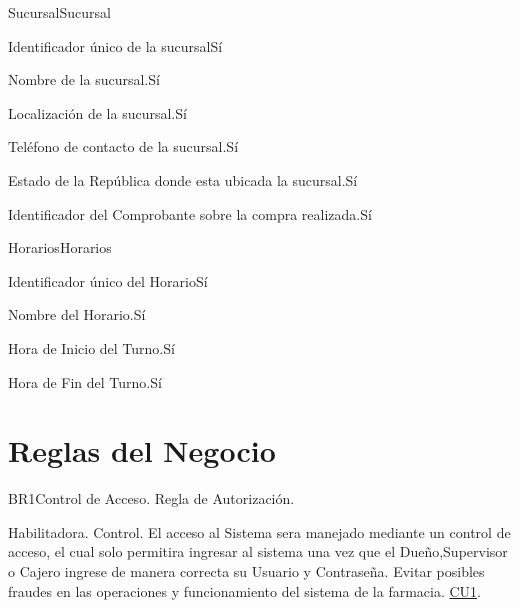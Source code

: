 \begin{cdtEntidad}{Sucursal}{Sucursal}

		{Identificador único de la sucursal}{Sí}
		
		{Nombre de la sucursal.}{Sí}

		{Localización de la sucursal.}{Sí}
	
		{Teléfono de contacto de la sucursal.}{Sí}
		
		{Estado de la República donde esta ubicada la sucursal.}{Sí}
		
		{Identificador del Comprobante sobre la compra realizada.}{Sí}	
\cdtEntityRelSection

\end{cdtEntidad}

\begin{cdtEntidad}{Horarios}{Horarios}

		{Identificador único del Horario}{Sí}
		
		{Nombre del Horario.}{Sí}

		{Hora de Inicio del Turno.}{Sí}
	
		{Hora de Fin del Turno.}{Sí}
		
\end{cdtEntidad}




\newpage
\section{Reglas del Negocio}
\begin{BussinesRule}{BR1}{Control de Acceso.}
	\BRitem[Tipo:] Regla de Autorización. 
				
	\BRitem[Clase:] Habilitadora. 
	\BRitem[Nivel:] Control. %
	\BRitem[Descripción:]	El acceso al Sistema sera manejado mediante un control de acceso, el cual solo permitira ingresar al sistema una vez que el Dueño,Supervisor o Cajero ingrese de manera correcta su Usuario y Contraseña.
	\BRitem[Motivación:] Evitar posibles fraudes en las operaciones y funcionamiento del sistema de la farmacia.
	 \hyperlink{CU1}{CU1}.
\end{BussinesRule}

